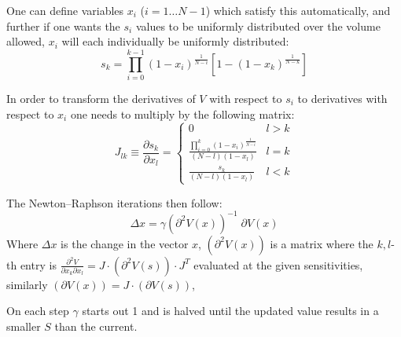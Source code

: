 \documentclass{article}
\begin{document}
One can define variables $x_i$ ($i=1\ldots N-1$) which satisfy this
automatically, and further if one wants the $s_i$ values to be uniformly
distributed over the volume allowed, $x_i$ will each individually be
uniformly distributed:
\begin{displaymath}
	s_k=\prod_{i=0}^{k-1} (1-x_i)^\frac{1}{N-i}
	\left[1-(1-x_k)^\frac{1}{N-k}\right]
\end{displaymath}

In order to transform the derivatives of $V$ with respect to $s_i$ to
derivatives with respect to $x_i$ one needs to multiply by the following
matrix:
\begin{displaymath}
	J_{lk}\equiv\frac{\partial s_k}{\partial x_l}=\left\{
	\begin{array}{ll}
		0 & l>k\\
		\frac{\prod_{i=0}^{k}(1-x_i)^\frac{1}{N-i}}{(N-l)(1-x_l)} 
			& l=k\\
		\frac{s_k}{(N-l)(1-x_l)} & l<k
	\end{array} \right.
\end{displaymath}

The Newton--Raphson iterations then follow:
\begin{displaymath}
	\Delta x = \gamma(\partial^2 V(x))^{-1}\;\partial{V(x)}
\end{displaymath}
Where $\Delta x$ is the change in the vector $x$, $(\partial^2 V(x))$ is a
matrix where the $k,l$-th entry is $\frac{\partial^2V}{\partial x_k \partial
x_l}=J\cdot(\partial^2V(s))\cdot J^T$ evaluated at the given sensitivities,
similarly $(\partial V(x))=J \cdot (\partial V(s))$,

On each step $\gamma$ starts out 1 and is halved until the updated value
results in a smaller $S$ than the current.
\end{document}
